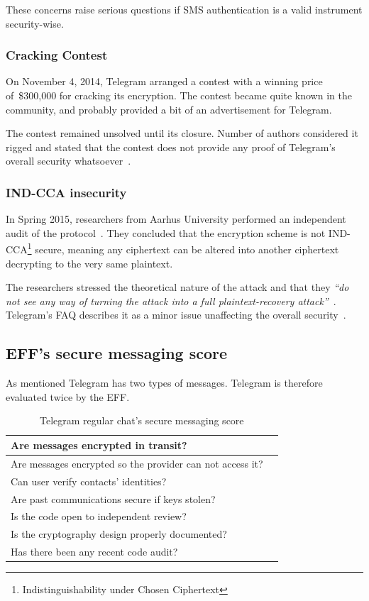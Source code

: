 \documentclass[thesis=M,english]{FITthesis}[2012/10/20]
\newcommand{\cmark}{\ding{51}}%
\newcommand{\xmark}{\ding{55}}%
\begin{document}
These concerns raise serious questions if SMS authentication is a valid instrument security-wise.

\subsubsection{Cracking Contest}

On November 4, 2014, Telegram arranged a contest with a winning price of~\$300,000 for cracking its encryption. The contest became quite known in the community, and probably provided a bit of an advertisement for Telegram.

The contest remained unsolved until its closure. Number of authors considered it rigged and stated that the contest does not provide any proof of Telegram's overall security whatsoever~\cite{telegramcontestfail,telegramcontestfail2}.

\subsubsection{IND-CCA insecurity}

In Spring 2015, researchers from Aarhus University performed an independent audit of the protocol~\cite{telegram-aarhus}. They concluded that the encryption scheme is not IND-CCA\footnote{Indistinguishability under Chosen Ciphertext} secure, meaning any ciphertext can be altered into another ciphertext decrypting to the very same plaintext.

The researchers stressed the theoretical nature of the attack and that they \emph{``do not see any way of turning the attack into a full plaintext-recovery attack''}~\cite{telegram-aarhus}. Telegram's FAQ describes it as a minor issue unaffecting the overall security~\cite{telegram-techfaq}.


\subsection{EFF's secure messaging score}

As mentioned Telegram has two types of messages. Telegram is therefore evaluated twice by the EFF.

\begin{table}[H]
	\centering
	\caption{Telegram regular chat's secure messaging score}
	\label{tab:telegram-regular-eff}
	\begin{tabular}{|l|l|}
		\hline
		Are messages encrypted in transit? & \cmark \\\hline
		Are messages encrypted so the provider can not access it? & \xmark \\ \hline
		Can user verify contacts' identities? & \xmark \\ \hline
		Are past communications secure if keys stolen? & \xmark \\ \hline
		Is the code open to independent review? & \xmark \\ \hline
		Is the cryptography design properly documented? & \cmark \\ \hline
		Has there been any recent code audit? & \cmark \\ \hline
	\end{tabular}
\end{table}
\end{document}

